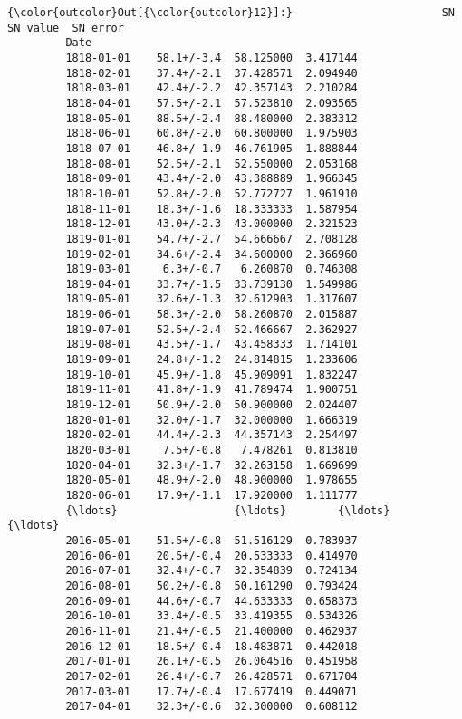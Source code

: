 \documentclass[11pt]{article}
\begin{document}
\begin{Verbatim}[commandchars=\\\{\}]
{\color{outcolor}Out[{\color{outcolor}12}]:}                       SN   SN value  SN error
         Date                                         
         1818-01-01    58.1+/-3.4  58.125000  3.417144
         1818-02-01    37.4+/-2.1  37.428571  2.094940
         1818-03-01    42.4+/-2.2  42.357143  2.210284
         1818-04-01    57.5+/-2.1  57.523810  2.093565
         1818-05-01    88.5+/-2.4  88.480000  2.383312
         1818-06-01    60.8+/-2.0  60.800000  1.975903
         1818-07-01    46.8+/-1.9  46.761905  1.888844
         1818-08-01    52.5+/-2.1  52.550000  2.053168
         1818-09-01    43.4+/-2.0  43.388889  1.966345
         1818-10-01    52.8+/-2.0  52.772727  1.961910
         1818-11-01    18.3+/-1.6  18.333333  1.587954
         1818-12-01    43.0+/-2.3  43.000000  2.321523
         1819-01-01    54.7+/-2.7  54.666667  2.708128
         1819-02-01    34.6+/-2.4  34.600000  2.366960
         1819-03-01     6.3+/-0.7   6.260870  0.746308
         1819-04-01    33.7+/-1.5  33.739130  1.549986
         1819-05-01    32.6+/-1.3  32.612903  1.317607
         1819-06-01    58.3+/-2.0  58.260870  2.015887
         1819-07-01    52.5+/-2.4  52.466667  2.362927
         1819-08-01    43.5+/-1.7  43.458333  1.714101
         1819-09-01    24.8+/-1.2  24.814815  1.233606
         1819-10-01    45.9+/-1.8  45.909091  1.832247
         1819-11-01    41.8+/-1.9  41.789474  1.900751
         1819-12-01    50.9+/-2.0  50.900000  2.024407
         1820-01-01    32.0+/-1.7  32.000000  1.666319
         1820-02-01    44.4+/-2.3  44.357143  2.254497
         1820-03-01     7.5+/-0.8   7.478261  0.813810
         1820-04-01    32.3+/-1.7  32.263158  1.669699
         1820-05-01    48.9+/-2.0  48.900000  1.978655
         1820-06-01    17.9+/-1.1  17.920000  1.111777
         {\ldots}                  {\ldots}        {\ldots}       {\ldots}
         2016-05-01    51.5+/-0.8  51.516129  0.783937
         2016-06-01    20.5+/-0.4  20.533333  0.414970
         2016-07-01    32.4+/-0.7  32.354839  0.724134
         2016-08-01    50.2+/-0.8  50.161290  0.793424
         2016-09-01    44.6+/-0.7  44.633333  0.658373
         2016-10-01    33.4+/-0.5  33.419355  0.534326
         2016-11-01    21.4+/-0.5  21.400000  0.462937
         2016-12-01    18.5+/-0.4  18.483871  0.442018
         2017-01-01    26.1+/-0.5  26.064516  0.451958
         2017-02-01    26.4+/-0.7  26.428571  0.671704
         2017-03-01    17.7+/-0.4  17.677419  0.449071
         2017-04-01    32.3+/-0.6  32.300000  0.608112

\end{Verbatim}
\end{document}
